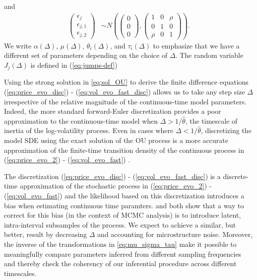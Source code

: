 and
\begin{align*}
  \left( \begin{matrix} \epsilon_{j} \\
      \epsilon_{j,1} \\ \epsilon_{j,2} \end{matrix} \right) &\sim
                                            N \left( \left(\begin{matrix} 0 \\ 0 \\
	                                          0 \end{matrix}
                                              \right) ,
  \left( \begin{matrix} 1 & 0 & \rho \\
      0 & 1 & 0 \\
    \rho & 0 & 1 \end{matrix} \right) \right) .
\end{align*}
We write $\alpha(\Delta)$, $\mu(\Delta)$, $\theta_i(\Delta)$, and $\tau_i(\Delta)$ to emphasize that we have a different set of parameters depending on the choice of $\Delta$. The random variable $J_j(\Delta)$ is defined in (\ref{eq:jumps-def})

Using the strong solution in \eqref{eq:sol_OU} to derive the finite difference equations (\ref{eq:price_evo_disc}) - (\ref{eq:vol_evo_fast_disc}) allows us to take any step size $\Delta$ irrespective of the relative magnitude of the continuous-time model parameters. Indeed, the more standard forward-Euler discretization provides a poor approximation to the continuous-time model when $\Delta > 1/\hat{\theta}$, the timescale of inertia of the log-volatility process. Even in cases where $\Delta < 1/\hat{\theta}$, discretizing the model SDE  using the exact solution of the OU process is a more accurate approximation of the finite-time transition density of the continuous process in (\ref{eq:price_evo_2}) - (\ref{eq:vol_evo_fast}) \cite{elerian2001likelihood}.

The discretization (\ref{eq:price_evo_disc}) - (\ref{eq:vol_evo_fast_disc}) is a discrete-time approximation of the stochastic process in (\ref{eq:price_evo_2}) - (\ref{eq:vol_evo_fast}) and the likelihood based on this discretization introduces a bias when estimating continuous time paramters. \cite{elerian2001likelihood} and \cite{eraker2001mcmc} both show that a way to correct for this bias (in the context of MCMC analysis) is to introduce latent, intra-interval subsamples of the process. We expect to achieve a similar, but better, result by decreasing $\Delta$ and accounting for microstructure noise. Moreover, the inverse of the transformations in \eqref{eq:mu_sigma_tau} make it possible to meaningfully compare parameters inferred from different sampling frequencies and thereby check the coherency of our inferential procedure across different timescales.

